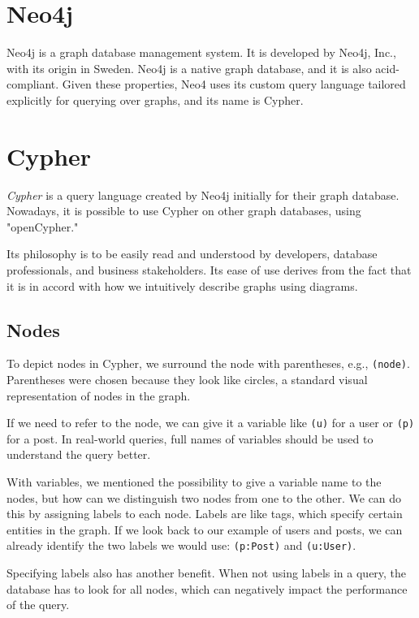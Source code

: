 \section{Neo4j}

Neo4j is a graph database management system. It is developed by Neo4j, Inc., with its origin in Sweden. \cite{noauthor_company_nodate}
Neo4j is a native graph database, and it is also \acrshort{acid}-compliant. Given these properties, Neo4 uses its custom query language tailored explicitly for querying over graphs,
and its name is Cypher. \cite{noauthor_neo4j_nodate-2}

\section{Cypher}

\textit{Cypher} is a query language created by Neo4j initially for their graph database. Nowadays, it is possible to use Cypher on other graph databases, using "openCypher." \cite{noauthor_resources_nodate}

Its philosophy is to be easily read and understood by developers, database professionals, and business stakeholders.
Its ease of use derives from the fact that it is in accord with how we intuitively describe graphs using diagrams. \cite{robinson_graph_2015}

\subsection{Nodes}

To depict nodes in Cypher, we surround the node with parentheses, e.g., \texttt{(node)}. Parentheses were chosen because they look like circles,
a standard visual representation of nodes in the graph. \cite{noauthor_getting_nodate}

If we need to refer to the node, we can give it a variable like \texttt{(u)} for a user or \texttt{(p)} for a post.
In real-world queries, full names of variables should be used to understand the query better.

With variables, we mentioned the possibility to give a variable name to the nodes, but how can we distinguish two nodes from one to the other.
We can do this by assigning labels to each node. Labels are like tags, which specify certain entities in the graph. If we look back to our example of users and posts,
we can already identify the two labels we would use: \texttt{(p:Post)} and \texttt{(u:User)}.

Specifying labels also has another benefit. When not using labels in a query, the database has to look for all nodes, which can negatively impact the performance of the query.
\cite{noauthor_getting_nodate}

